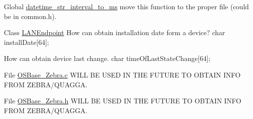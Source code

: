 \label{todo__todo000003}
\hypertarget{todo__todo000003}{}
 
\begin{DoxyDescription}
\item[Global \hyperlink{_o_s_base___l_a_n_endpoint_8c_a4516f8c4ceb2bb917acb8e3e4e5cedb9}{datetime\_\-str\_\-interval\_\-to\_\-ms} ]move this function to the proper file (could be in common.h). 
\end{DoxyDescription}

\label{todo__todo000001}
\hypertarget{todo__todo000001}{}
 
\begin{DoxyDescription}
\item[Class \hyperlink{struct_l_a_n_endpoint}{LANEndpoint} ]How can obtain installation date form a device? char installDate\mbox{[}64\mbox{]}; 

How can obtain device last change. char timeOfLastStateChange\mbox{[}64\mbox{]}; 
\end{DoxyDescription}

\label{todo__todo000004}
\hypertarget{todo__todo000004}{}
 
\begin{DoxyDescription}
\item[File \hyperlink{_o_s_base___zebra_8c}{OSBase\_\-Zebra.c} ]WILL BE USED IN THE FUTURE TO OBTAIN INFO FROM ZEBRA/QUAGGA. 
\end{DoxyDescription}

\label{todo__todo000002}
\hypertarget{todo__todo000002}{}
 
\begin{DoxyDescription}
\item[File \hyperlink{_o_s_base___zebra_8h}{OSBase\_\-Zebra.h} ]WILL BE USED IN THE FUTURE TO OBTAIN INFO FROM ZEBRA/QUAGGA. 
\end{DoxyDescription}